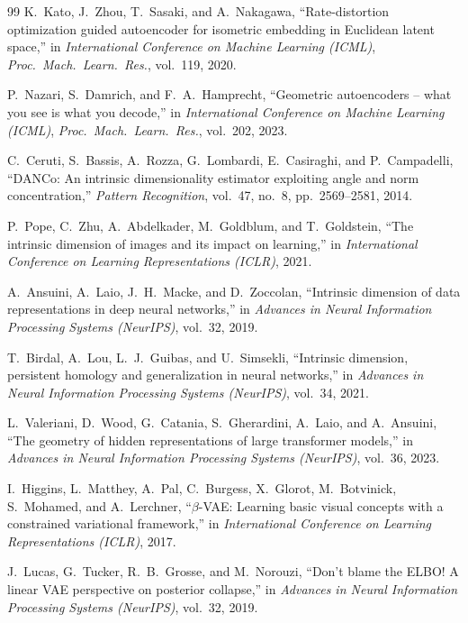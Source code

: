 \documentclass[12pt,a4paper]{jsarticle}
\begin{document}
\begin{thebibliography}{99}
K.~Kato, J.~Zhou, T.~Sasaki, and A.~Nakagawa,
``Rate-distortion optimization guided autoencoder for isometric embedding
in Euclidean latent space,''
in \textit{International Conference on Machine Learning (ICML)},
\textit{Proc.~Mach.~Learn.~Res.}, vol.~119, 2020.

P.~Nazari, S.~Damrich, and F.~A.~Hamprecht,
``Geometric autoencoders -- what you see is what you decode,''
in \textit{International Conference on Machine Learning (ICML)},
\textit{Proc.~Mach.~Learn.~Res.}, vol.~202, 2023.

C.~Ceruti, S.~Bassis, A.~Rozza, G.~Lombardi, E.~Casiraghi, and P.~Campadelli,
``DANCo: An intrinsic dimensionality estimator exploiting angle and norm concentration,''
\textit{Pattern Recognition}, vol.~47, no.~8, pp.~2569--2581, 2014.

P.~Pope, C.~Zhu, A.~Abdelkader, M.~Goldblum, and T.~Goldstein,
``The intrinsic dimension of images and its impact on learning,''
in \textit{International Conference on Learning Representations (ICLR)}, 2021.

A.~Ansuini, A.~Laio, J.~H.~Macke, and D.~Zoccolan,
``Intrinsic dimension of data representations in deep neural networks,''
in \textit{Advances in Neural Information Processing Systems (NeurIPS)},
vol.~32, 2019.

T.~Birdal, A.~Lou, L.~J.~Guibas, and U.~Simsekli,
``Intrinsic dimension, persistent homology and generalization
in neural networks,''
in \textit{Advances in Neural Information Processing Systems (NeurIPS)},
vol.~34, 2021.

L.~Valeriani, D.~Wood, G.~Catania, S.~Gherardini, A.~Laio, and A.~Ansuini,
``The geometry of hidden representations of large transformer models,''
in \textit{Advances in Neural Information Processing Systems (NeurIPS)},
vol.~36, 2023.

I.~Higgins, L.~Matthey, A.~Pal, C.~Burgess, X.~Glorot, M.~Botvinick,
S.~Mohamed, and A.~Lerchner,
``$\beta$-VAE: Learning basic visual concepts with a constrained variational framework,''
in \textit{International Conference on Learning Representations (ICLR)}, 2017.

J.~Lucas, G.~Tucker, R.~B.~Grosse, and M.~Norouzi,
``Don't blame the ELBO! A linear VAE perspective on posterior collapse,''
in \textit{Advances in Neural Information Processing Systems (NeurIPS)}, vol.~32, 2019.


\end{thebibliography}
\end{document}
